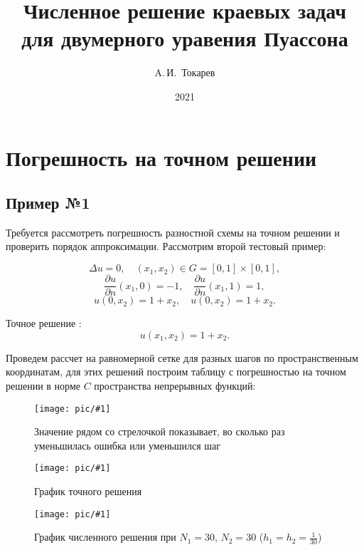 \documentclass[12pt, a4paper]{article}
\title{Численное решение краевых задач для двумерного уравения Пуассона}
\author{A.\,И.~Токарев}
\date{2021}
\newcommand{\Picture}[4]
{
\begin{figure}[H]
\noindent 
\centering\texttt{[image: pic/\#1]}
\caption{#3}
\label{#4}
\end{figure}
}
\begin{document}
\maketitle
\tableofcontents 
\newpage

\section{Погрешность на точном решении}
\subsection{Пример №1}

Требуется рассмотреть погрешность разностной схемы на точном решении и проверить порядок аппроксимации. Рассмотрим второй тестовый пример:

\[
\Delta u = 0, \quad (x_1, x_2)\in G = [0,1] \times[0,1],
\]
\[
\dfrac{\partial u}{\partial n}(x_1, 0) = -1, \quad \dfrac{\partial u}{\partial n}(x_1, 1) = 1,
\]
\[
u(0, x_2) = 1+x_2, \quad u(0,x_2) = 1+x_2.
\]

Точное решение :
\[
u(x_1,x_2) = 1 + x_2.
\]

Проведем рассчет на равномерной сетке для разных шагов по пространственным координатам, для этих решений построим таблицу с погрешностью на точном решении в норме $C$ пространства непрерывных функций:

\Picture{погр.png}{1}{Значение рядом со стрелочкой показывает, во сколько раз уменьшилась ошибка или уменьшился шаг}{}

\Picture{точн.pdf}{1}{График точного решения}{}

\Picture{числ.pdf}{1}{График численного решения при $N_1 = 30$, $N_2=30$ ($h_1 =h_2= \frac{1}{30}$)}{}





\newpage
\end{document}
